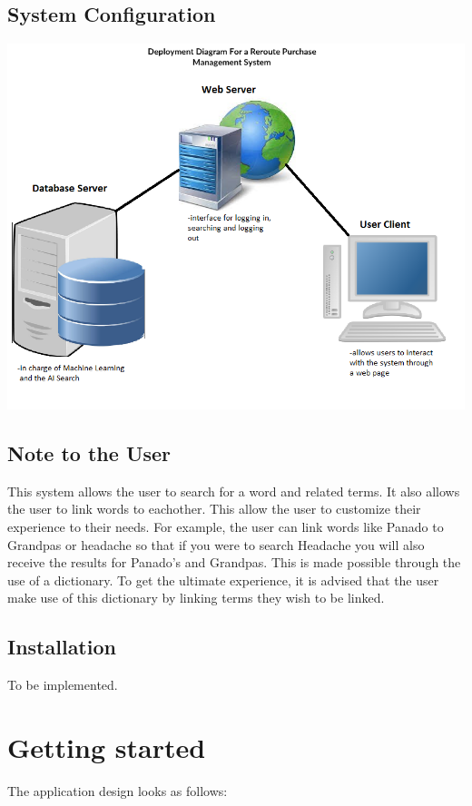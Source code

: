 \documentclass[a4paper,10pt]{article}
\begin{document}
\subsection{System Configuration}
	{\centering\includegraphics[width=15cm, scale=0.5]{User Manual Deployment diagram.png}} \\

\subsection{Note to the User}
This system allows the user to search for a word and related terms. It also allows the user to link words to eachother. This allow the user to customize their experience to their needs. For example, the user can link words like Panado to Grandpas or headache so that if you were to search Headache you will also receive the results for Panado's and Grandpas. This is made possible through the use of a dictionary. To get the ultimate experience, it is advised that the user make use of this dictionary by linking terms they wish to be linked.

\subsection{Installation}
To be implemented.

\section{Getting started}
	The application design looks as follows: \\
\end{document}
